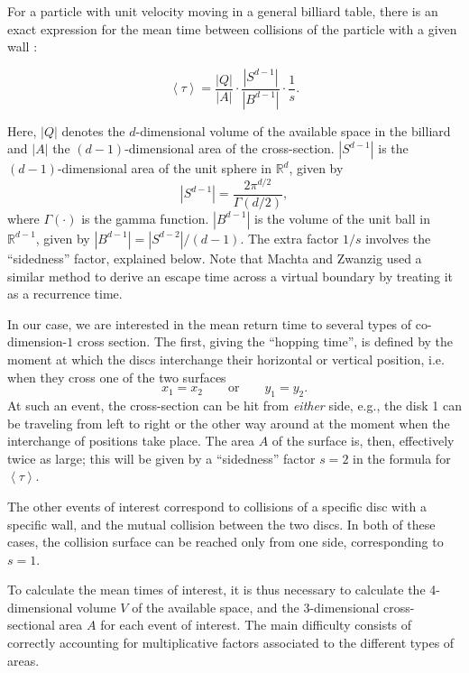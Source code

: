 \documentclass[superscriptaddress,pre,reprint,showpacs,twocolumn]{revtex4-1}
\newcommand{\mean}[1]{\left \langle #1 \right \rangle}
\newcommand{\RR}{\mathbb{R}}
\begin{document}
For a particle with unit velocity moving in a general billiard table, there is 
an exact expression for the mean time between 
collisions of the particle with a given wall \cite{Chernov97}:

\begin{equation}\label{meanfreetime}
 \mean{\tau} = \frac{|Q|}{|A|} \cdot \frac{|S^{d-1}|} {|B^{d-1}|} \cdot \frac{1}{s}.
\end{equation}


Here, $|Q|$ denotes the $d$-dimensional volume of the available 
space in the billiard and 
$|A|$ the $(d-1)$-dimensional area of the cross-section.
 $|S^{d-1}|$ is the $(d-1)$-dimensional area of the unit sphere in $\RR^d$, given by
\begin{equation}
  |S^{d-1}| = \frac{2 \pi^{d/2}}{\Gamma(d/2)},
\end{equation}
where $\Gamma(\cdot)$ is the gamma function. 
$|B^{d-1}|$ is the volume of the unit ball 
in $\RR^{d-1}$, given by $|B^{d-1}| = |S^{d-2}| / (d-1)$.
The extra factor $1/s$ involves the ``sidedness'' factor, explained below.
Note that Machta and Zwanzig \cite{MachtaZwan} used a similar method to derive an escape 
time across a virtual boundary by treating it as a recurrence time.

In our case, we are interested in the mean return time to 
several types of co-dimension-$1$ cross section.
The first, giving the ``hopping time'', 
is defined by the moment
at which the discs interchange their horizontal or vertical position, i.e.
when they cross one of the two surfaces
\begin{equation} \label{condchoque}
x_1 = x_2  \qquad \text{or} \qquad y_1 = y_2.
\end{equation}
At such an event, the cross-section can be hit from \emph{either} side,
e.g., the disk 1 can be traveling from left to right or the other way around
at the moment when the interchange of positions take place. 
The area $A$ of the surface is, then, 
effectively twice as large; this will be given by a ``sidedness'' factor $s=2$ in the formula
for $\mean{\tau}$.

The other events of interest correspond to collisions of a specific
disc with a specific wall, and the mutual collision between the two discs.
In both of these cases, the collision surface can be reached only from one side, corresponding to $s = 1$.

To calculate the mean times of interest, it is thus necessary to calculate
the 4-dimensional volume $V$ of the available space, and the 3-dimensional cross-sectional area $A$ 
for each event of interest. The main difficulty consists of correctly accounting for multiplicative factors associated to the different 
types of areas.
\end{document}

